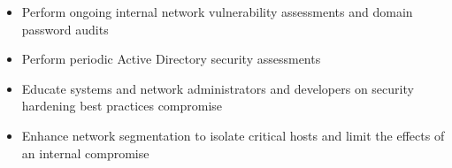 \begin{itemize}
\item Perform ongoing internal network vulnerability assessments and domain password audits
\item Perform periodic Active Directory security assessments
\item Educate systems and network administrators and developers on security hardening best practices compromise
\item Enhance network segmentation to isolate critical hosts and limit the effects of an internal compromise
\end{itemize}